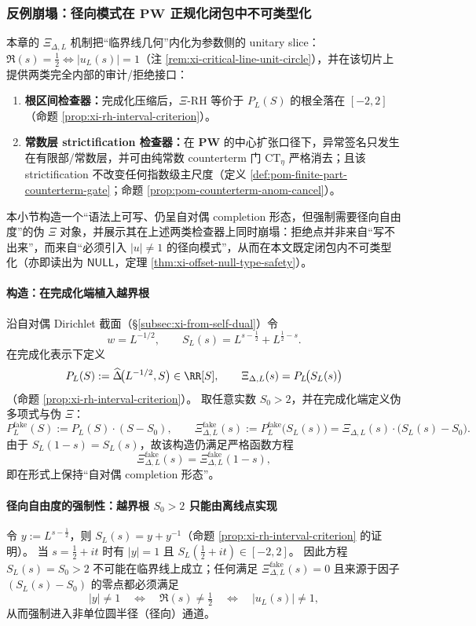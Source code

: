 \subsubsection{反例崩塌：径向模式在 \texorpdfstring{$\mathbf{PW}$}{PW} 正规化闭包中不可类型化}\label{subsec:xi-radial-counterexample-collapse}
本章的 \(\Xi_{\Delta,L}\) 机制把“临界线几何”内化为参数侧的 unitary slice：\(\Re(s)=\tfrac12\Longleftrightarrow |u_L(s)|=1\)（注 \ref{rem:xi-critical-line-unit-circle}），并在该切片上提供两类完全内部的审计/拒绝接口：
\begin{enumerate}
  \item \textbf{根区间检查器：}完成化压缩后，\(\Xi\)-RH 等价于 \(P_L(S)\) 的根全落在 \([-2,2]\)（命题 \ref{prop:xi-rh-interval-criterion}）。
  \item \textbf{常数层 strictification 检查器：}在 \(\mathbf{PW}\) 的中心扩张口径下，异常签名只发生在有限部/常数层，并可由纯常数 counterterm 门 \(\mathrm{CT}_\eta\) 严格消去；且该 strictification 不改变任何指数级主尺度（定义 \ref{def:pom-finite-part-counterterm-gate}；命题 \ref{prop:pom-counterterm-anom-cancel}）。
\end{enumerate}
本小节构造一个“语法上可写、仍呈自对偶 completion 形态，但强制需要径向自由度”的伪 \(\Xi\) 对象，并展示其在上述两类检查器上同时崩塌：拒绝点并非来自“写不出来”，而来自“必须引入 \(|u|\neq 1\) 的径向模式”，从而在本文既定闭包内不可类型化（亦即读出为 \(\mathsf{NULL}\)，定理 \ref{thm:xi-offset-null-type-safety}）。

\paragraph{构造：在完成化端植入越界根}
沿自对偶 Dirichlet 截面（\S\ref{subsec:xi-from-self-dual}）令
\[
w=L^{-1/2},\qquad S_L(s)=L^{s-\tfrac12}+L^{\tfrac12-s}.
\]
在完成化表示下定义
\[
P_L(S):=\widehat\Delta\!\bigl(L^{-1/2},S\bigr)\in\RR[S],
\qquad
\Xi_{\Delta,L}(s)=P_L\!\bigl(S_L(s)\bigr)
\]
（命题 \ref{prop:xi-rh-interval-criterion}）。
取任意实数 \(S_0>2\)，并在完成化端定义伪多项式与伪 \(\Xi\)：
\[
P^{\mathrm{fake}}_L(S):=P_L(S)\cdot (S-S_0),
\qquad
\Xi^{\mathrm{fake}}_{\Delta,L}(s):=P^{\mathrm{fake}}_L\!\bigl(S_L(s)\bigr)
=\Xi_{\Delta,L}(s)\cdot\bigl(S_L(s)-S_0\bigr).
\]
由于 \(S_L(1-s)=S_L(s)\)，故该构造仍满足严格函数方程
\[
\Xi^{\mathrm{fake}}_{\Delta,L}(s)=\Xi^{\mathrm{fake}}_{\Delta,L}(1-s),
\]
即在形式上保持“自对偶 completion 形态”。



\paragraph{径向自由度的强制性：越界根 \texorpdfstring{$S_0>2$}{S0>2} 只能由离线点实现}
令 \(y:=L^{s-\tfrac12}\)，则 \(S_L(s)=y+y^{-1}\)（命题 \ref{prop:xi-rh-interval-criterion} 的证明）。
当 \(s=\tfrac12+it\) 时有 \(|y|=1\) 且 \(S_L(\tfrac12+it)\in[-2,2]\)。
因此方程
\(
S_L(s)=S_0>2
\)
不可能在临界线上成立；任何满足 \(\Xi^{\mathrm{fake}}_{\Delta,L}(s)=0\) 且来源于因子 \((S_L(s)-S_0)\) 的零点都必须满足
\[
|y|\neq 1
\quad\Longleftrightarrow\quad
\Re(s)\neq\tfrac12
\quad\Longleftrightarrow\quad
|u_L(s)|\neq 1,
\]
从而强制进入非单位圆半径（径向）通道。

